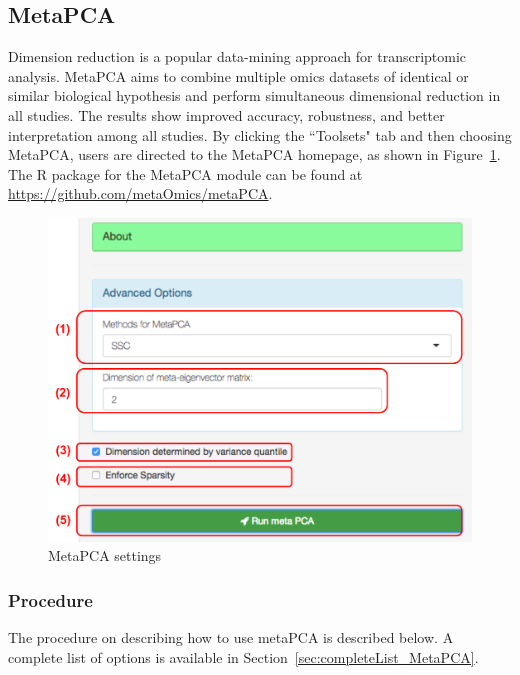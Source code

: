 \subsection{MetaPCA}
Dimension reduction is a popular data-mining approach for transcriptomic analysis.
MetaPCA aims to combine multiple omics datasets of identical or similar biological hypothesis and perform simultaneous dimensional reduction in all studies.
The results show improved accuracy, robustness, and better interpretation among all studies.
By clicking the ``Toolsets" tab and then choosing MetaPCA,
users are directed to the MetaPCA homepage, as shown in Figure~\ref{fig:metaPCAHome}.
The R package for the MetaPCA module can be found at \url{https://github.com/metaOmics/metaPCA}.

\begin{figure}[H]
\begin{center}
\includegraphics[scale=0.4]{./figure/metaPCA/metaPCAHome.pdf}
\caption{MetaPCA settings}
\label{fig:metaPCAHome}
\end{center}
\end{figure}

\subsubsection{Procedure}

The procedure on describing how to use metaPCA is described below.
A complete list of options is available in Section~\ref{sec:completeList_MetaPCA}.

